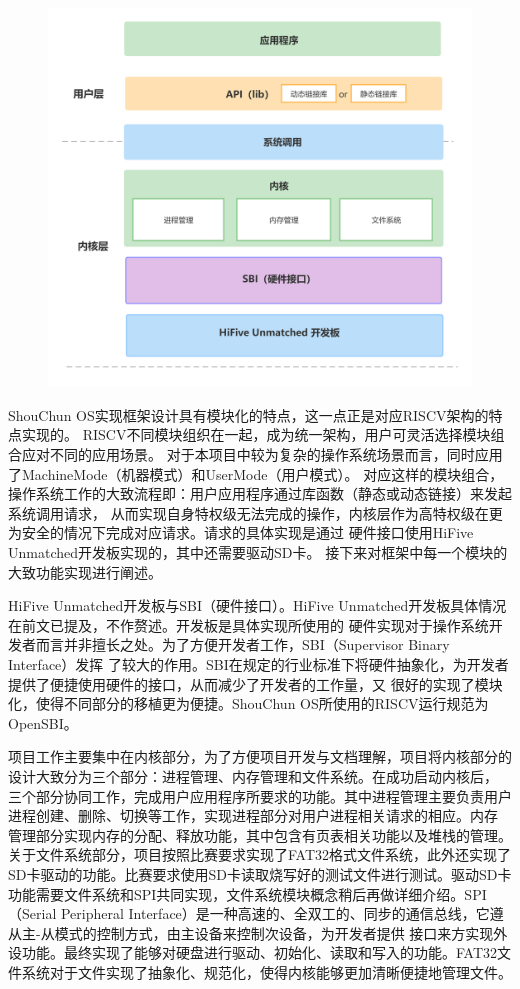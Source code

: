 \documentclass[UTF8,a4paper,10pt]{ctexart}
\begin{document}
\begin{figure}[H]
  \centering
  \includegraphics[scale=0.15]{image/img01.png}
\end{figure}

ShouChun OS实现框架设计具有模块化的特点，这一点正是对应RISCV架构的特点实现的。
RISCV不同模块组织在一起，成为统一架构，用户可灵活选择模块组合应对不同的应用场景。
对于本项目中较为复杂的操作系统场景而言，同时应用了MachineMode（机器模式）和UserMode（用户模式）。
对应这样的模块组合，操作系统工作的大致流程即：用户应用程序通过库函数（静态或动态链接）来发起系统调用请求，
从而实现自身特权级无法完成的操作，内核层作为高特权级在更为安全的情况下完成对应请求。请求的具体实现是通过
硬件接口使用HiFive Unmatched开发板实现的，其中还需要驱动SD卡。
接下来对框架中每一个模块的大致功能实现进行阐述。

HiFive Unmatched开发板与SBI（硬件接口）。HiFive Unmatched开发板具体情况在前文已提及，不作赘述。开发板是具体实现所使用的
硬件实现对于操作系统开发者而言并非擅长之处。为了方便开发者工作，SBI（Supervisor Binary Interface）发挥
了较大的作用。SBI在规定的行业标准下将硬件抽象化，为开发者提供了便捷使用硬件的接口，从而减少了开发者的工作量，又
很好的实现了模块化，使得不同部分的移植更为便捷。ShouChun OS所使用的RISCV运行规范为OpenSBI。

项目工作主要集中在内核部分，为了方便项目开发与文档理解，项目将内核部分的设计大致分为三个部分：进程管理、内存管理和文件系统。在成功启动内核后，
三个部分协同工作，完成用户应用程序所要求的功能。其中进程管理主要负责用户进程创建、删除、切换等工作，实现进程部分对用户进程相关请求的相应。内存
管理部分实现内存的分配、释放功能，其中包含有页表相关功能以及堆栈的管理。关于文件系统部分，项目按照比赛要求实现了FAT32格式文件系统，此外还实现了
SD卡驱动的功能。比赛要求使用SD卡读取烧写好的测试文件进行测试。驱动SD卡功能需要文件系统和SPI共同实现，文件系统模块概念稍后再做详细介绍。SPI
（Serial Peripheral Interface）是一种高速的、全双工的、同步的通信总线，它遵从主-从模式的控制方式，由主设备来控制次设备，为开发者提供
接口来方实现外设功能。最终实现了能够对硬盘进行驱动、初始化、读取和写入的功能。FAT32文件系统对于文件实现了抽象化、规范化，使得内核能够更加清晰便捷地管理文件。
\end{document}
